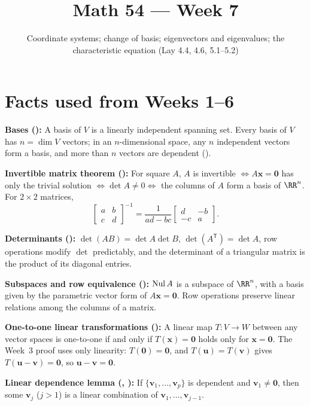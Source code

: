 \documentclass[10pt]{scrartcl}
\title{Math 54 --- Week 7}
\subtitle{Coordinate systems; change of basis; eigenvectors and eigenvalues; the characteristic equation (Lay 4.4, 4.6, 5.1--5.2)}
\author{}\date{}\ihead{}
\newcommand{\vv}[1]{\mathbf{#1}}
\begin{document}
\maketitle

\section{Facts used from Weeks 1--6}

\begin{enumerate}[label=(W\arabic*),leftmargin=2.8em,itemsep=4pt]
  \ii {}\textbf{Bases ():} A basis of $V$ is a linearly independent spanning set. Every basis of $V$ has $n=\dim V$ vectors; in an $n$-dimensional space, any $n$ independent vectors form a basis, and more than $n$ vectors are dependent ().

  \ii {}\textbf{Invertible matrix theorem ():} For square $A$, $A$ is invertible $\iff A\vv x=\vv 0$ has only the trivial solution $\iff \det A\ne 0 \iff$ the columns of $A$ form a basis of $\RR^n$. For $2\times 2$ matrices,
  \[
    \begin{bmatrix}a&b\\c&d\end{bmatrix}^{-1}=\frac{1}{ad-bc}\begin{bmatrix}d&-b\\-c&a\end{bmatrix}.
  \]

  \ii {}\textbf{Determinants ():} $\det(AB)=\det A\det B$, $\det(A^{\mathsf T})=\det A$, row operations modify $\det$ predictably, and the determinant of a triangular matrix is the product of its diagonal entries.

  \ii {}\textbf{Subspaces and row equivalence ():} $\operatorname{Nul} A$ is a subspace of $\RR^n$, with a basis given by the parametric vector form of $A\vv x=\vv 0$. Row operations preserve linear relations among the columns of a matrix.

  \ii {}\textbf{One-to-one linear transformations ():} A linear map $T\colon V\to W$ between any vector spaces is one-to-one if and only if $T(\vv x)=\vv 0$ holds only for $\vv x=\vv 0$. The Week~3 proof uses only linearity: $T(\vv 0)=\vv 0$, and $T(\vv u)=T(\vv v)$ gives $T(\vv u-\vv v)=\vv 0$, so $\vv u-\vv v=\vv 0$.

  \ii {}\textbf{Linear dependence lemma (, ):} If $\{\vv v_1,\dots,\vv v_p\}$ is dependent and $\vv v_1\ne\vv 0$, then some $\vv v_j$ ($j>1$) is a linear combination of $\vv v_1,\dots,\vv v_{j-1}$.
\end{enumerate}
\end{document}
